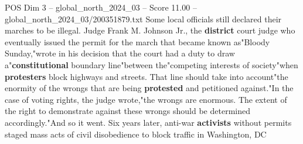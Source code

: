 \begin{textsample}{POS Dim 3 – global\_north\_2024\_03 – Score 11.00 – global\_north\_2024\_03/200351879.txt}
Some local officials still declared their marches to be illegal.
Judge Frank M.
Johnson Jr., the \textbf{district} court judge who eventually issued the permit for the march that became known as"Bloody Sunday,"wrote in his decision that the court had a duty to draw a"\textbf{constitutional} boundary line"between the"competing interests of society"when \textbf{protesters} block highways and streets.
That line should take into account"the enormity of the wrongs that are being \textbf{protested} and petitioned against."In the case of voting rights, the judge wrote,"the wrongs are enormous.
The extent of the right to demonstrate against these wrongs should be determined accordingly."And so it went.
Six years later, anti-war \textbf{activists} without permits staged mass acts of civil disobedience to block traffic in Washington, DC

\end{textsample}
